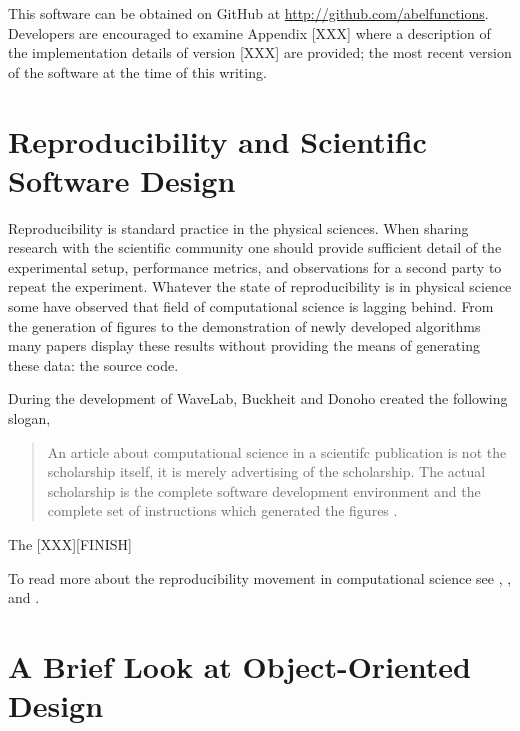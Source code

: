 This software can be obtained on GitHub at
\url{http://github.com/abelfunctions}. Developers are encouraged to examine
Appendix [XXX] where a description of the implementation details of version
[XXX] are provided; the most recent version of the software at the time of this
writing.


\section{Reproducibility and Scientific Software Design}\label{sec:reproducibility}

Reproducibility is standard practice in the physical sciences. When sharing
research with the scientific community one should provide sufficient detail of
the experimental setup, performance metrics, and observations for a second party
to repeat the experiment. Whatever the state of reproducibility is in physical
science some have observed that field of computational science is lagging
behind. From the generation of figures to the demonstration of newly developed
algorithms many papers display these results without providing the means of
generating these data: the source code.

During the development of WaveLab, Buckheit and Donoho created the following
slogan,
\begin{quotation}
  An article about computational science in a scientifc publication is not the
  scholarship itself, it is merely advertising of the scholarship. The actual
  scholarship is the complete software development environment and the complete
  set of instructions which generated the figures \cite{buckheit1995wavelab}.
\end{quotation}
The [XXX][FINISH]

To read more about the reproducibility movement in computational science see
\cite{peng2011reproducible}, \cite{stodden2012reproducible}, and
\cite{stodden2013best}.


\section{A Brief Look at Object-Oriented Design}\label{sec:object-oriented-design}

